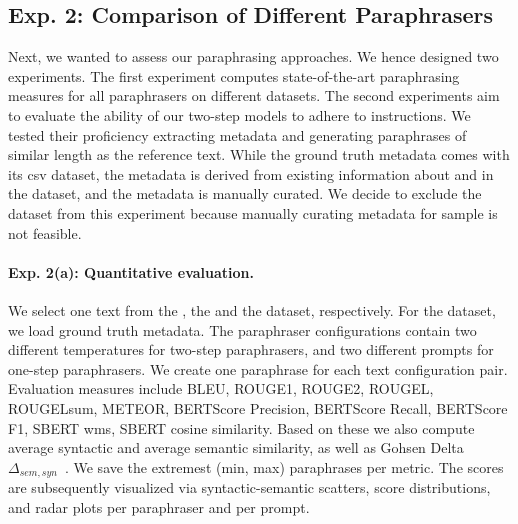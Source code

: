\subsection{Exp. 2: Comparison of Different Paraphrasers}
\label{subsec:comp_paraphrasers_setup}

Next, we wanted to assess our paraphrasing approaches.
We hence designed two experiments.
The first experiment computes state-of-the-art paraphrasing measures for all paraphrasers on different datasets.
The second experiments aim to evaluate the ability of our two-step models to adhere to instructions.
We tested their proficiency extracting metadata and generating paraphrases of similar length as the reference text.
While the \dataBlog{} ground truth metadata comes with its csv dataset, the \dataStudent{} metadata is derived from existing information about and in the dataset, and the \dataGutenberg{} metadata is manually curated.
We decide to exclude the \dataPan{} dataset from this experiment because manually curating metadata for \dataPan{} sample is not feasible.

\paragraph{Exp. 2(a): Quantitative evaluation.}

We select one text from the \dataBlog{}, the \dataGutenberg{} and the \dataStudent{} dataset, respectively.
For the \dataGutenberg{} dataset, we load ground truth metadata. %
The paraphraser configurations contain two different temperatures for two-step paraphrasers, and two different prompts for one-step paraphrasers.
We create one paraphrase for each text configuration pair.
Evaluation measures include BLEU, ROUGE1, ROUGE2, ROUGEL, ROUGELsum, METEOR, BERTScore Precision, BERTScore Recall, BERTScore F1, SBERT \ac{wms}, SBERT cosine similarity.
Based on these we also compute average syntactic and average semantic similarity, as well as Gohsen Delta $\Delta_{sem,syn}$~\citep{gohsen_captions_2023}.
We save the extremest (min, max) paraphrases per metric.
The scores are subsequently visualized via syntactic-semantic scatters, score distributions, and radar plots per paraphraser and per prompt. 

